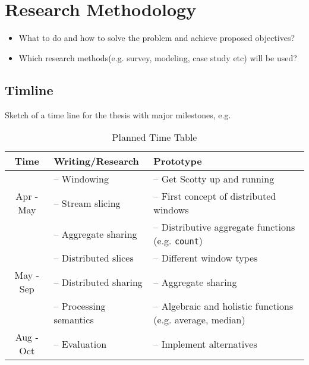 \section*{Research Methodology}
\label{sec:methodology}

\begin{itemize}
	\item What to do and how to solve the problem and achieve proposed 
	objectives? 
	\item Which research methods(e.g. survey, modeling, case study etc) will be 
	used?
\end{itemize} 

\subsection*{Timline} 
Sketch of a time line for the thesis with major milestones, e.g.

\begin{table}[h!]
	\centering
	\begin{tabular}{ | c | m{} | m{} | }
		\hline
		\textbf{Time} & \textbf{Writing/Research} & \textbf{Prototype} \\
		\hline
		& -- Windowing         & -- Get Scotty up and running\\
		Apr - May & -- Stream slicing    & -- First concept of distributed 
		windows\\
		& -- Aggregate sharing & -- Distributive aggregate functions (e.g. 
		\texttt{count})\\
		\hline
		& -- Distributed slices   & -- Different window types\\
		May - Sep & -- Distributed sharing  & -- Aggregate sharing\\
		& -- Processing semantics & -- Algebraic and holistic functions (e.g. 
		average, median)\\
		\hline
		Aug - Oct & -- Evaluation & -- Implement alternatives \\
		\hline
	\end{tabular}
	\label{tab:time-table}
	\caption{Planned Time Table}
\end{table}